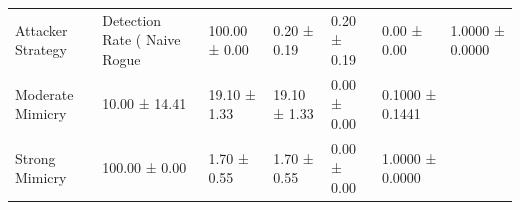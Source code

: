 \begin{tabular}{llllll}
\toprule
Attacker Strategy & Detection Rate (%
\midrule
Naive Rogue & 100.00 ± 0.00 & 0.20 ± 0.19 & 0.20 ± 0.19 & 0.00 ± 0.00 & 1.0000 ± 0.0000 \\
Moderate Mimicry & 10.00 ± 14.41 & 19.10 ± 1.33 & 19.10 ± 1.33 & 0.00 ± 0.00 & 0.1000 ± 0.1441 \\
Strong Mimicry & 100.00 ± 0.00 & 1.70 ± 0.55 & 1.70 ± 0.55 & 0.00 ± 0.00 & 1.0000 ± 0.0000 \\
\bottomrule
\end{tabular}
